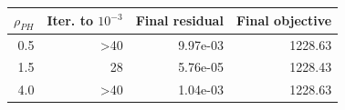 \begin{tabular}{rrrr}
\toprule
$\rho_{PH}$ & Iter. to $10^{-3}$ & Final residual & Final objective \\
\midrule
0.5 & >40 & 9.97e-03 & 1228.63 \\
1.5 & 28 & 5.76e-05 & 1228.43 \\
4.0 & >40 & 1.04e-03 & 1228.63 \\
\bottomrule
\end{tabular}
